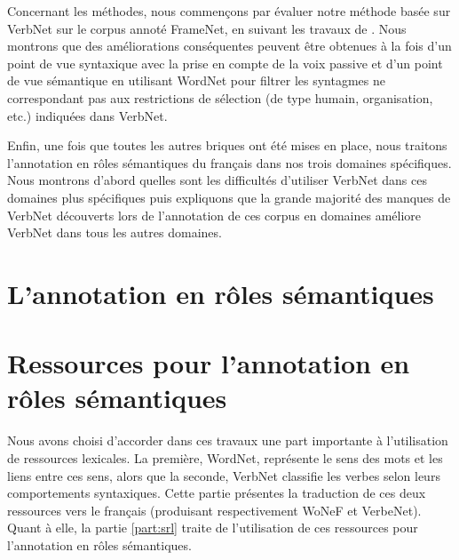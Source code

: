 \documentclass[oneside,parskip,draft]{scrbook}
\begin{document}
Concernant les méthodes, nous commençons par évaluer notre méthode basée sur
VerbNet sur le corpus annoté FrameNet, en suivant les travaux de
\cite{swier2005exploiting}.  Nous montrons que des améliorations conséquentes
peuvent être obtenues à la fois d'un point de vue syntaxique avec la prise en
compte de la voix passive et d'un point de vue sémantique en utilisant WordNet
pour filtrer les syntagmes ne correspondant pas aux restrictions de sélection
(de type humain, organisation, etc.) indiquées dans VerbNet.

Enfin, une fois que toutes les autres briques ont été mises en place, nous
traitons l'annotation en rôles sémantiques du français dans nos trois domaines
spécifiques. Nous montrons d'abord quelles sont les difficultés d'utiliser
VerbNet dans ces domaines plus spécifiques puis expliquons que la grande
majorité des manques de VerbNet découverts lors de l'annotation de ces corpus
en domaines améliore VerbNet dans tous les autres domaines.


\setcounter{tocdepth}{3}
\tableofcontents

\mainmatter

\part{L'annotation en rôles sémantiques}





\part{Ressources pour l'annotation en rôles sémantiques}
\label{part:translation}


Nous avons choisi d'accorder dans ces travaux une part importante à
l'utilisation de ressources lexicales. La première, WordNet, représente le sens
des mots et les liens entre ces sens, alors que la seconde, VerbNet classifie
les verbes selon leurs comportements syntaxiques. Cette partie présentes la
traduction de ces deux ressources vers le français (produisant respectivement
WoNeF et VerbeNet). Quant à elle, la partie \ref{part:srl} traite de
l'utilisation de ces ressources pour l'annotation en rôles sémantiques.
\end{document}
